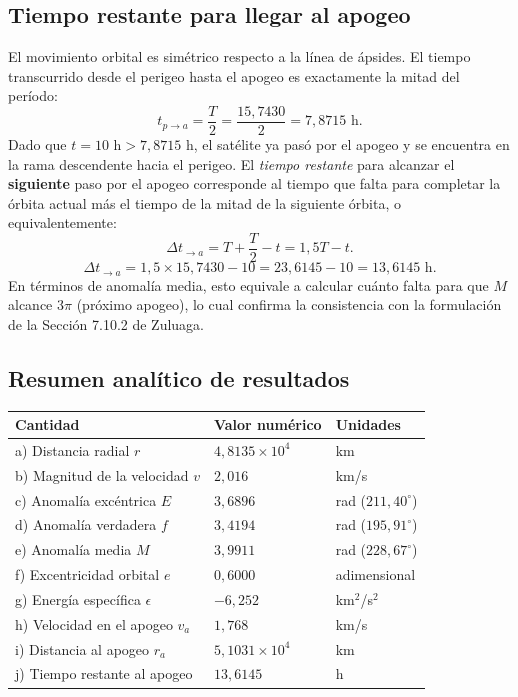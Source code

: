 \documentclass[12pt, a4paper]{article}
\begin{document}
\subsection*{Tiempo restante para llegar al apogeo}
El movimiento orbital es simétrico respecto a la línea de ápsides. El tiempo transcurrido desde el perigeo hasta el apogeo es exactamente la mitad del período:
$$ t_{p \to a} = \frac{T}{2} = \frac{15,7430}{2} = 7,8715 \text{ h}. $$
Dado que $t = 10 \text{ h} > 7,8715 \text{ h}$, el satélite ya pasó por el apogeo y se encuentra en la rama descendente hacia el perigeo. El \textit{tiempo restante} para alcanzar el \textbf{siguiente} paso por el apogeo corresponde al tiempo que falta para completar la órbita actual más el tiempo de la mitad de la siguiente órbita, o equivalentemente:
$$ \Delta t_{\to a} = T + \frac{T}{2} - t = 1,5T - t. $$
$$ \Delta t_{\to a} = 1,5 \times 15,7430 - 10 = 23,6145 - 10 = 13,6145 \text{ h}. $$
En términos de anomalía media, esto equivale a calcular cuánto falta para que $M$ alcance $3\pi$ (próximo apogeo), lo cual confirma la consistencia con la formulación de la Sección 7.10.2 de Zuluaga.

\subsection*{Resumen analítico de resultados}
\begin{center}
\begin{tabular}{lll}
    \hline
    \textbf{Cantidad} & \textbf{Valor numérico} & \textbf{Unidades} \\
    \hline
    a) Distancia radial $r$ & $4,8135 \times 10^4$ & km \\
    b) Magnitud de la velocidad $v$ & $2,016$ & km/s \\
    c) Anomalía excéntrica $E$ & $3,6896$ & rad ($211,40^\circ$) \\
    d) Anomalía verdadera $f$ & $3,4194$ & rad ($195,91^\circ$) \\
    e) Anomalía media $M$ & $3,9911$ & rad ($228,67^\circ$) \\
    f) Excentricidad orbital $e$ & $0,6000$ & adimensional \\
    g) Energía específica $\epsilon$ & $-6,252$ & km$^2$/s$^2$ \\
    h) Velocidad en el apogeo $v_a$ & $1,768$ & km/s \\
    i) Distancia al apogeo $r_a$ & $5,1031 \times 10^4$ & km \\
    j) Tiempo restante al apogeo & $13,6145$ & h \\
    \hline
\end{tabular}
\end{center}
\end{document}
